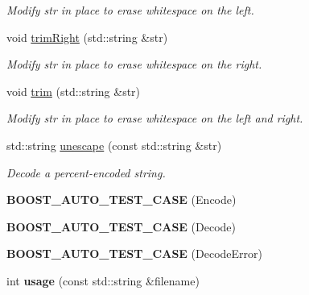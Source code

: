 \begin{DoxyCompactItemize}
\begin{DoxyCompactList}\small\item\em Modify str in place to erase whitespace on the left. \end{DoxyCompactList}\item 
void \hyperlink{namespacendn_ad37d45b51f12f42badd4273cc5d336a7}{trim\+Right} (std\+::string \&str)\hypertarget{namespacendn_ad37d45b51f12f42badd4273cc5d336a7}{}\label{namespacendn_ad37d45b51f12f42badd4273cc5d336a7}

\begin{DoxyCompactList}\small\item\em Modify str in place to erase whitespace on the right. \end{DoxyCompactList}\item 
void \hyperlink{namespacendn_ae9612a10ce4762719f1f28db59e196f8}{trim} (std\+::string \&str)\hypertarget{namespacendn_ae9612a10ce4762719f1f28db59e196f8}{}\label{namespacendn_ae9612a10ce4762719f1f28db59e196f8}

\begin{DoxyCompactList}\small\item\em Modify str in place to erase whitespace on the left and right. \end{DoxyCompactList}\item 
std\+::string \hyperlink{namespacendn_a5b682038e79d7d4a4b2a107f27f7c214}{unescape} (const std\+::string \&str)
\begin{DoxyCompactList}\small\item\em Decode a percent-\/encoded string. \end{DoxyCompactList}\item 
{\bfseries B\+O\+O\+S\+T\+\_\+\+A\+U\+T\+O\+\_\+\+T\+E\+S\+T\+\_\+\+C\+A\+SE} (Encode)\hypertarget{namespacendn_ab69ee0e088e492d4ab52be4a6136e513}{}\label{namespacendn_ab69ee0e088e492d4ab52be4a6136e513}

\item 
{\bfseries B\+O\+O\+S\+T\+\_\+\+A\+U\+T\+O\+\_\+\+T\+E\+S\+T\+\_\+\+C\+A\+SE} (Decode)\hypertarget{namespacendn_a855d2d9a6a968259bfd1e6a28989e808}{}\label{namespacendn_a855d2d9a6a968259bfd1e6a28989e808}

\item 
{\bfseries B\+O\+O\+S\+T\+\_\+\+A\+U\+T\+O\+\_\+\+T\+E\+S\+T\+\_\+\+C\+A\+SE} (Decode\+Error)\hypertarget{namespacendn_ae6899ede5e46db7d5f354c2060fa5fc4}{}\label{namespacendn_ae6899ede5e46db7d5f354c2060fa5fc4}

\item 
int {\bfseries usage} (const std\+::string \&filename)\hypertarget{namespacendn_ac1e3c3911c743930199d838e944f9059}{}\label{namespacendn_ac1e3c3911c743930199d838e944f9059}


\end{DoxyCompactItemize}
